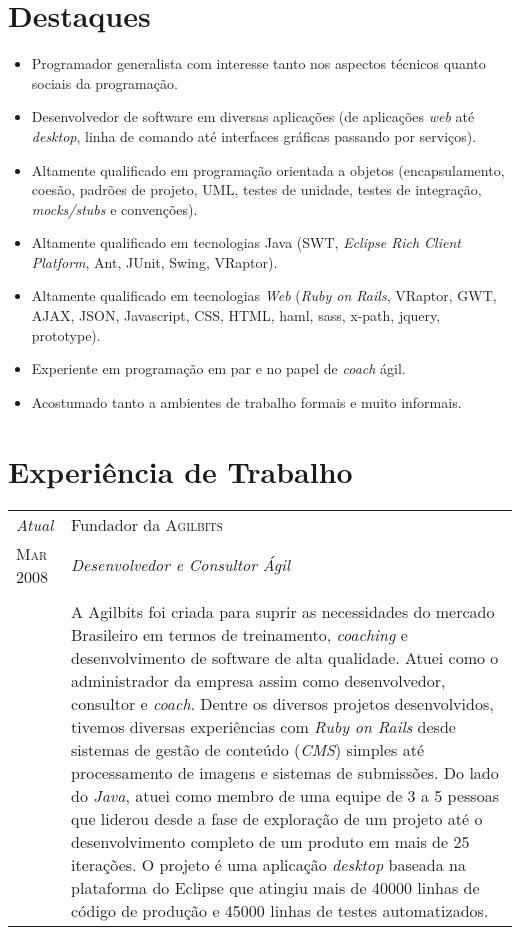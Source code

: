 \documentclass[letter,10pt]{article}
\begin{document}
\section{Destaques}

\begin{itemize}
\item Programador generalista com interesse tanto nos aspectos
  técnicos quanto sociais da programação.
\item Desenvolvedor de software em diversas aplicações (de aplicações
  \textit{web} até \textit{desktop}, linha de comando até interfaces
  gráficas passando por serviços).
\item Altamente qualificado em programação orientada a objetos
  (encapsulamento, coesão, padrões de projeto, UML, testes de unidade,
  testes de integração, \textit{mocks/stubs} e convenções).
\item Altamente qualificado em tecnologias Java (SWT, \textit{Eclipse
    Rich Client Platform}, Ant, JUnit, Swing, VRaptor).
\item Altamente qualificado em tecnologias \textit{Web} (\textit{Ruby
    on Rails}, VRaptor, GWT, AJAX, JSON, Javascript, CSS, HTML, haml,
  sass, x-path, jquery, prototype).
\item Experiente em programação em par e no papel de \textit{coach}
  ágil.
\item Acostumado tanto a ambientes de trabalho formais e muito
  informais.
\end{itemize}

\section{Experiência de Trabalho}

\begin{tabular}{p{2.5cm}|p{13.5cm}}
  \emph{Atual} & Fundador da \textsc{Agilbits}\\
  \textsc{Mar 2008}& \emph{Desenvolvedor e Consultor Ágil}\\
  &\\
  &A Agilbits foi criada para suprir as necessidades do mercado
  Brasileiro em termos de treinamento, \textit{coaching} e
  desenvolvimento de software de alta qualidade. Atuei como o
  administrador da empresa assim como desenvolvedor, consultor e
  \textit{coach}.
  Dentre os diversos projetos desenvolvidos, tivemos diversas
  experiências com \textit{Ruby on Rails} desde sistemas de gestão de
  conteúdo (\textit{CMS}) simples até processamento de imagens e
  sistemas de submissões.
  Do lado do \textit{Java}, atuei como membro de uma equipe de 3 a 5
  pessoas que liderou desde a fase de exploração de um projeto até o
  desenvolvimento completo de um produto em mais de 25 iterações. O
  projeto é uma aplicação \textit{desktop} baseada na plataforma do
  Eclipse que atingiu mais de 40000 linhas de código de produção e
  45000 linhas de testes automatizados.
\end{tabular}
\end{document}
